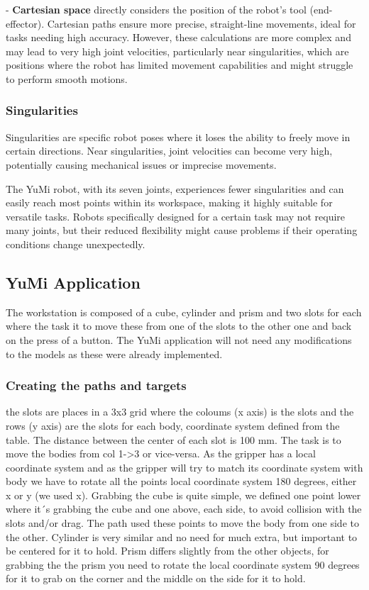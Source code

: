 \documentclass[a4paper,12pt]{article}
\begin{document}
- \textbf{Cartesian space} directly considers the position of the robot's tool (end-effector). Cartesian paths ensure more precise, straight-line movements, ideal for tasks needing high accuracy. However, these calculations are more complex and may lead to very high joint velocities, particularly near singularities, which are positions where the robot has limited movement capabilities and might struggle to perform smooth motions.

\subsubsection{Singularities}
Singularities are specific robot poses where it loses the ability to freely move in certain directions. Near singularities, joint velocities can become very high, potentially causing mechanical issues or imprecise movements.

The YuMi robot, with its seven joints, experiences fewer singularities and can easily reach most points within its workspace, making it highly suitable for versatile tasks. Robots specifically designed for a certain task may not require many joints, but their reduced flexibility might cause problems if their operating conditions change unexpectedly.



\subsection{YuMi Application}
The workstation is composed of a cube, cylinder and prism and two slots for each where the task it to move these from one of the slots to the other one and back on the press of a button.
The YuMi application will not need any modifications to the models as these were already implemented.
\subsubsection{Creating the paths and targets}
the slots are places in a 3x3 grid where the coloums (x axis) is the slots and the rows (y axis) are the slots for each body, coordinate system defined from the table. The distance between the center of each slot is 100 mm. The task is to move the bodies from col 1->3 or vice-versa. 
As the gripper has a local coordinate system and as the gripper will try to match its coordinate system with body we have to rotate all the points local coordinate system 180 degrees, either x or y (we used x).
Grabbing the cube is quite simple, we defined one point lower where it´s grabbing the cube and one above, each side, to avoid collision with the slots and/or drag. The path used these points to move the body from one side to the other.
Cylinder is very similar and no need for much extra, but important to be centered for it to hold.
Prism differs slightly from the other objects, for grabbing the the prism you need to rotate the local coordinate system 90 degrees for it to grab on the corner and the middle on the side for it to hold.  
\end{document}
